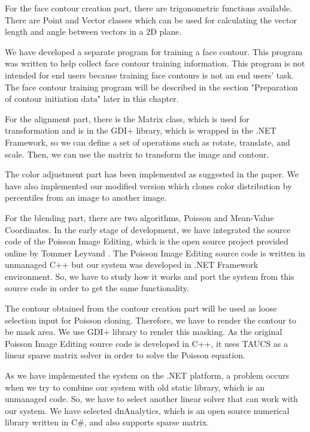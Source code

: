 For the face contour creation part, there are trigonometric functions available. There are Point and Vector classes which can be used for calculating the vector length and angle between vectors in a 2D plane.

We have developed a separate program for training a face contour. This program was written to help collect face contour training information. This program is not intended for end users because training face contours is not an end users' task. The face contour training program will be described in the section "Preparation of contour initiation data" later in this chapter.

For the alignment part, there is the Matrix class, which is used for transformation and is in the GDI+ library, which is wrapped in the .NET Framework, so we can define a set of operations such as rotate, translate, and scale. Then, we can use the matrix to transform the image and contour.

The color adjustment part has been implemented as suggested in the paper. We have also implemented our modified version which clones color distribution by percentiles from an image to another image.

For the blending part, there are two algorithms, Poisson and Mean-Value Coordinates. In the early stage of development, we have integrated the source code of the Poisson Image Editing, which is the open source project provided online by Tommer Leyvand \cite{website:TommerLeyvand}. The Poisson Image Editing source code is written in unmanaged C++ but our system was developed in .NET Framework environment. So, we have to study how it works and port the system from this source code in order to get the same functionality.

The contour obtained from the contour creation part will be used as loose selection input for Poisson cloning. Therefore, we have to render the contour to be mask area. We use GDI+ library to render this masking. As the original Poisson Image Editing source code is developed in C++, it uses TAUCS as a linear sparse matrix solver in order to solve the Poisson equation.

As we have implemented the system on the .NET platform, a problem occurs when we try to combine our system with old static library, which is an unmanaged code. So, we have to select another linear solver that can work with our system. We have selected dnAnalytics, which is an open source numerical library written in C\#, and also supports sparse matrix.

